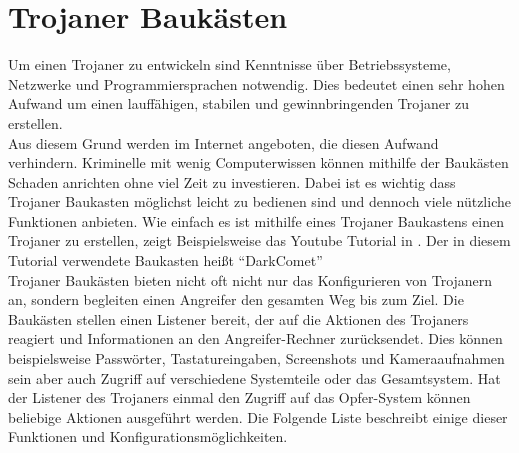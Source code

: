 \section{Trojaner Baukästen}\label{sec:trojanerBaukaesten}
Um einen Trojaner zu entwickeln sind Kenntnisse über Betriebssysteme, Netzwerke und Programmiersprachen notwendig.
Dies bedeutet einen sehr hohen Aufwand um einen lauffähigen, stabilen und gewinnbringenden Trojaner zu erstellen.\\
Aus diesem Grund werden  im Internet angeboten, die diesen Aufwand verhindern. 
Kriminelle mit wenig Computerwissen können mithilfe der Baukästen Schaden anrichten ohne viel Zeit zu investieren.
Dabei ist es wichtig dass Trojaner Baukasten möglichst leicht zu bedienen sind und dennoch viele nützliche Funktionen anbieten. 
Wie einfach es ist mithilfe eines Trojaner Baukastens einen Trojaner zu erstellen, zeigt Beispielsweise das Youtube Tutorial in \cite{YOUTUBE}.
Der in diesem Tutorial verwendete Baukasten heißt \enquote{DarkComet}\\
Trojaner Baukästen bieten nicht oft nicht nur das Konfigurieren von Trojanern an, sondern
begleiten einen Angreifer den gesamten Weg bis zum Ziel. 
Die Baukästen stellen einen Listener bereit, der auf die Aktionen des Trojaners reagiert und Informationen an den
Angreifer-Rechner zurücksendet. Dies können beispielsweise Passwörter, Tastatureingaben, Screenshots und Kameraaufnahmen sein aber auch Zugriff auf verschiedene
Systemteile oder das Gesamtsystem. Hat der Listener des Trojaners einmal den Zugriff auf das Opfer-System können beliebige Aktionen ausgeführt werden.
Die Folgende Liste beschreibt einige dieser Funktionen und Konfigurationsmöglichkeiten.\cite{PANDA}
